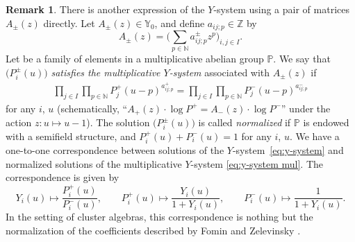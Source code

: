\documentclass[pdftex]{sigma}
\numberwithin{equation}{section}
\theoremstyle{definition}
\newtheorem{Remark}[Theorem]{Remark}
\begin{document}
\begin{Remark}
 There is another expression of the $Y$-system using a pair of matrices $A_\pm (z)$ directly.
 Let $A_\pm (z) \in \mathbb{Y}_0$, and define $a_{ij;p} \in \mathbb{Z}$ by
 \begin{equation*}
 A_\pm (z) = \biggl( \sum_{p \in \mathbb{N}} a_{ij;p}^\pm z^p \biggr)_{i,j \in I}.
 \end{equation*}
 Let  be a family of elements in
 a multiplicative abelian group $\mathbb{P}$.
 We say that $\bigl(P_i^\pm (u)\bigr)$ \emph{satisfies the multiplicative $Y$-system} associated with $A_\pm (z)$ if
 \begin{align}\label{eq:y-system mul}
 \prod_{j \in I} \prod_{p \in \mathbb{N}} P_j^+ (u-p)^{a_{ij;p}^+}
 = \prod_{j \in I} \prod_{p \in \mathbb{N}} P_j^- (u-p)^{a_{ij;p}^-}
 \end{align}
 for any $i$, $u$ (schematically, ``$A_+(z) \cdot \log P^+ = A_-(z) \cdot \log P^-$''
 under the action $z\colon u \mapsto u-1$).
 The solution $\bigl(P_i^\pm (u)\bigr)$ is called \emph{normalized} if
 $\mathbb{P}$ is endowed with a semifield structure, and
$
 P_i^+(u) + P_i^-(u) = 1
$
 for any $i$, $u$.
 We have a one-to-one correspondence between solutions of the $Y$-system~\eqref{eq:y-system} and
 normalized solutions of the multiplicative $Y$-system \eqref{eq:y-system mul}.
 The correspondence is given by
 \begin{equation*}
 Y_i (u) \mapsto \frac{P_i^+(u)}{P_i^-(u)},\qquad
 P_i^+ (u) \mapsto \frac{Y_i(u)}{1+Y_i(u)},\qquad
 P_i^- (u) \mapsto \frac{1}{1+Y_i(u)}.
 \end{equation*}
 In the setting of cluster algebras, this correspondence is nothing but
 the normalization of the coefficients described by Fomin and Zelevinsky \cite[Section 5]{FZ1}.
\end{Remark}
\end{document}
